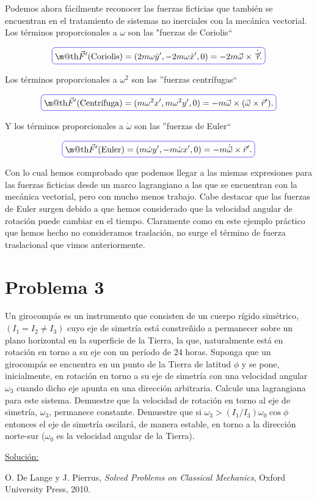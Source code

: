 \documentclass[a4paper,10pt]{article}
\makeatletter
\numberwithin{equation}{section}
\newcommand*{\boxcolor}{blue}
\renewcommand{\boxed}[1]{\textcolor{\boxcolor}{%
\tikz[baseline={([yshift=-1ex]current bounding box.center)}] \node [rectangle, minimum width=1ex,rounded corners,draw] {\normalcolor\m@th$\displaystyle#1$};}}
\makeatother
\begin{document}
Podemos ahora fácilmente reconocer las fuerzas ficticias que también se encuentran en 
el tratamiento de sistemas no inerciales con la mecánica vectorial. Los términos 
proporcionales a $\omega$ son las "fuerzas de Coriolis``

\begin{equation}
\boxed{ \vec{F}' \text{(Coriolis)} = (2m\omega\dot{y}', -2m\omega\dot{x}', 0) = -2m\vec{\omega} \times \dot{\vec{r}'}.}
\end{equation}

Los términos proporcionales a $\omega^2$ son las ''fuerzas centrífugas`` 

\begin{equation}
 \boxed{\vec{F}' \text{(Centrífuga)} = ( m \omega^2 x', m\omega^2 y', 0) = - m \vec{\omega} \times (\vec{\omega} \times \vec{r}').}
\end{equation}

Y los términos proporcionales a $\dot{\omega}$ son las ''fuerzas de Euler``

\begin{equation}
 \boxed{\vec{F}' \text{(Euler)} = (m\dot{\omega}y', -m\dot{\omega}x', 0 ) = - m \dot{\vec{\omega}} \times \vec{r}'.}
\end{equation}

Con lo cual hemos comprobado que podemos llegar a las mismas expresiones para las fuerzas 
ficticias desde un marco lagrangiano a las que se encuentran con la mecánica vectorial, pero 
con mucho menos trabajo. Cabe destacar que las fuerzas de Euler surgen debido a que 
hemos considerado que la velocidad angular de rotación puede cambiar en el tiempo. Claramente 
como en este ejemplo práctico que hemos hecho no consideramos traslación, no surge 
el término de fuerza traslacional que vimos anteriormente.


\section{Problema 3}

Un girocompás es un instrumento que consisten de un cuerpo rígido simétrico, 
$(I_1 = I_2 \ne I_3)$ cuyo eje de simetría está constreñido a permanecer sobre 
un plano horizontal en la superficie de la Tierra, la que, naturalmente está en 
rotación en torno a su eje con un período de 24 horas. Suponga que un girocompás 
se encuentra en un punto de la Tierra de latitud $\phi$ y se pone, inicialmente, 
en rotación en torno a su eje de simetría con una velocidad angular $\omega_3$ cuando 
dicho eje apunta en una dirección arbitraria. Calcule una lagrangiana para este 
sistema. Demuestre que la velocidad de rotación en torno al eje de simetría, $\omega_3$,
permanece constante. Demuestre que si $\omega_3 > (I_1/I_3)\omega_0\cos{\phi}$ entonces 
el eje de simetría oscilará, de manera estable, en torno a la dirección norte-sur 
($\omega_0$ es la velocidad angular de la Tierra).

\vspace{.3cm}

\underline{Solución:} \vspace{.3cm}


\begin{thebibliography}{10}
 O. De Lange y J. Pierrus, \emph{Solved Problems on Classical Mechanics}, Oxford 
 University Press, 2010.
\end{thebibliography}
\end{document}
